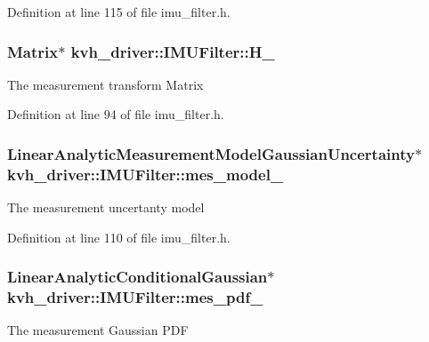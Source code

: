 \-Definition at line 115 of file imu\-\_\-filter.\-h.

\subsubsection[{\-H\-\_\-}]{\setlength{\rightskip}{0pt plus 5cm}\-Matrix$\ast$ {\bf kvh\-\_\-driver\-::\-I\-M\-U\-Filter\-::\-H\-\_\-}\hspace{0.3cm}{\ttfamily  [private]}}\label{classkvh__driver_1_1IMUFilter_ad7b470b96bc0d3f817e5e0915ae8f4f0}
\-The measurement transform \-Matrix 

\-Definition at line 94 of file imu\-\_\-filter.\-h.

\subsubsection[{mes\-\_\-model\-\_\-}]{\setlength{\rightskip}{0pt plus 5cm}\-Linear\-Analytic\-Measurement\-Model\-Gaussian\-Uncertainty$\ast$ {\bf kvh\-\_\-driver\-::\-I\-M\-U\-Filter\-::mes\-\_\-model\-\_\-}\hspace{0.3cm}{\ttfamily  [private]}}\label{classkvh__driver_1_1IMUFilter_a5dee2c82d998f87a2f7a65461e1a5ac3}
\-The measurement uncertanty model 

\-Definition at line 110 of file imu\-\_\-filter.\-h.

\subsubsection[{mes\-\_\-pdf\-\_\-}]{\setlength{\rightskip}{0pt plus 5cm}\-Linear\-Analytic\-Conditional\-Gaussian$\ast$ {\bf kvh\-\_\-driver\-::\-I\-M\-U\-Filter\-::mes\-\_\-pdf\-\_\-}\hspace{0.3cm}{\ttfamily  [private]}}\label{classkvh__driver_1_1IMUFilter_a20887e6c8867c9ecb7896c3c04cb2330}
\-The measurement \-Gaussian \-P\-D\-F 

